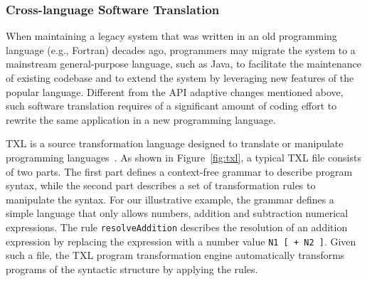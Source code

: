 \documentclass[runningheads,a4paper]{llncs}
\newcommand{\codefont}[1]{\footnotesize{\texttt{#1}}\normalsize}
\begin{document}
\subsubsection{Cross-language Software Translation}
When maintaining a legacy system that was written in an old programming language (e.g., Fortran) decades ago, programmers may migrate the system to a mainstream general-purpose language, such as Java, to facilitate the maintenance of existing codebase and to extend the system by leveraging new features of the popular language. Different from the API adaptive changes mentioned above, such software translation requires of a significant amount of coding effort to rewrite the same application in a new programming language.

TXL is a source transformation language designed to translate or manipulate programming languages~\cite{Cordy2006}. As shown in Figure~\ref{fig:txl}, a typical TXL file consists of two parts. The first part defines a context-free grammar to describe program syntax, while the second part describes a set of transformation rules to manipulate the syntax. For our illustrative example, the grammar defines a simple language that only allows numbers, addition and subtraction numerical expressions. The rule \codefont{resolveAddition} describes the resolution of an addition expression by replacing the expression with a number value \codefont{N1 [ + N2 ]}. Given such a file, the TXL program transformation engine automatically transforms programs of the syntactic structure by applying the rules. 
\end{document}
